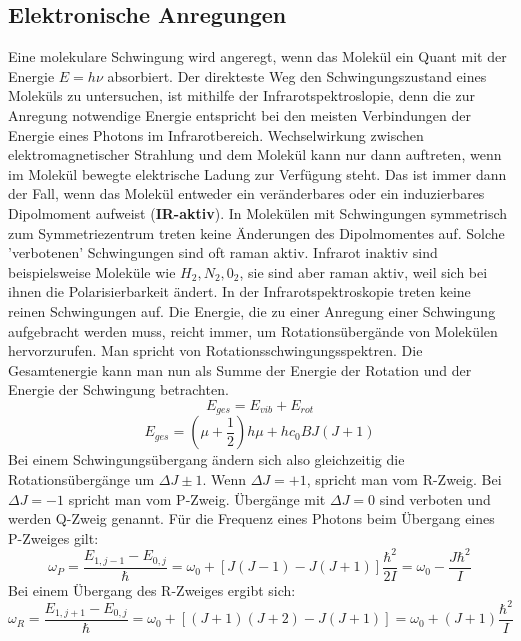 \documentclass[11pt]{article}
\begin{document}
\subsection{Elektronische Anregungen}
Eine molekulare Schwingung wird angeregt, wenn das Molekül ein Quant mit der
Energie $E=h\nu$ absorbiert. Der direkteste Weg den Schwingungszustand eines
Moleküls zu untersuchen, ist mithilfe der Infrarotspektroslopie, denn die zur
Anregung notwendige Energie entspricht bei den meisten Verbindungen der Energie
eines Photons im Infrarotbereich. Wechselwirkung zwischen elektromagnetischer
Strahlung und dem Molekül kann nur dann auftreten, wenn im Molekül bewegte
elektrische Ladung zur Verfügung steht. Das ist immer dann der Fall, wenn das
Molekül entweder ein veränderbares oder ein induzierbares Dipolmoment aufweist
(\textbf{IR-aktiv}). In Molekülen mit Schwingungen symmetrisch zum
Symmetriezentrum treten keine Änderungen des Dipolmomentes auf. Solche
'verbotenen' Schwingungen sind oft raman aktiv. Infrarot inaktiv sind
beispielsweise Moleküle wie $H_2, N_2, 0_2$, sie sind aber raman aktiv, weil
sich bei ihnen die Polarisierbarkeit ändert.
In der Infrarotspektroskopie treten keine reinen Schwingungen auf. Die Energie,
die zu einer Anregung einer Schwingung aufgebracht werden muss, reicht immer,
um Rotationsübergände von Molekülen hervorzurufen. Man spricht von
Rotationsschwingungsspektren. Die Gesamtenergie kann man nun als Summe der
Energie der Rotation und der Energie der Schwingung betrachten.
\begin{equation}
  E_{ges}=E_{vib}+E_{rot}
\end{equation}
\begin{equation}
  E_{ges}=\left(\mu+\frac{1}{2}\right)h\mu+hc_0BJ(J+1)
\end{equation}
Bei einem Schwingungsübergang ändern sich also gleichzeitig die
Rotationsübergänge um $\Delta J\pm1$. Wenn $\Delta J=+1$, spricht man vom
R-Zweig. Bei $\Delta J=-1$ spricht man vom P-Zweig. Übergänge mit $\Delta J=0$
sind verboten und werden Q-Zweig genannt.
Für die Frequenz eines Photons beim Übergang eines P-Zweiges gilt:
\begin{equation}
  \omega_P=\frac{E_{1,j-1}-E_{0,j}}{\hbar}=\omega_0+
  [J(J-1)-J(J+1)]\frac{\hbar^2}{2I}=\omega_0-\frac{J\hbar^2}{I}
\end{equation}
Bei einem Übergang des R-Zweiges ergibt sich:
\begin{equation}
  \omega_R=\frac{E_{1,j+1}-E_{0,j}}{\hbar}=\omega_0+[(J+1)(J+2)-J(J+1)]=
  \omega_0+(J+1)\frac{\hbar^2}{I}
\end{equation}
\end{document}

